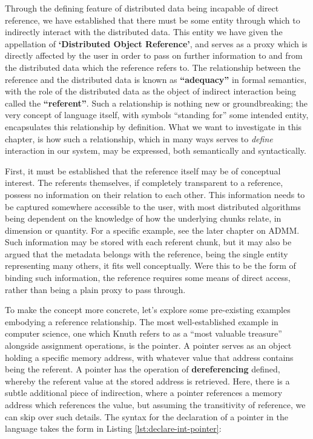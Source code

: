 Through the defining feature of distributed data being incapable of
direct reference, we have established that there must be some entity
through which to indirectly interact with the distributed data. This
entity we have given the appellation of \textbf{`Distributed Object
    Reference'}, and serves as a proxy which is directly affected by the
user in order to pass on further information to and from the distributed
data which the reference refers to. The relationship between the
reference and the distributed data is known as \textbf{``adequacy''} in
formal semantics, with the role of the distributed data as the object of
indirect interaction being called the \textbf{``referent''}. Such a
relationship is nothing new or groundbreaking; the very concept of
language itself, with symbols ``standing for'' some intended entity,
encapsulates this relationship by definition. What we want to
investigate in this chapter, is how such a relationship, which in many
ways serves to \emph{define} interaction in our system, may be
expressed, both semantically and syntactically.

First, it must be established that the reference itself may be of
conceptual interest. The referents themselves, if completely transparent
to a reference, possess no information on their relation to each other.
This information needs to be captured somewhere accessible to the user,
with most distributed algorithms being dependent on the knowledge of how
the underlying chunks relate, in dimension or quantity. For a specific
example, see the later chapter on ADMM. Such information may be stored
with each referent chunk, but it may also be argued that the metadata
belongs with the reference, being the single entity representing many
others, it fits well conceptually. Were this to be the form of binding
such information, the reference requires some means of direct access,
rather than being a plain proxy to pass through.

To make the concept more concrete, let's explore some pre-existing
examples embodying a reference relationship. The most well-established
example in computer science, one which Knuth refers to as a ``most
valuable treasure'' alongside assignment operations, is the pointer. A
pointer serves as an object holding a specific memory address, with
whatever value that address contains being the referent. A pointer has
the operation of \textbf{dereferencing} defined, whereby the referent
value at the stored address is retrieved. Here, there is a subtle
additional piece of indirection, where a pointer references a memory
address which references the value, but assuming the transitivity of
reference, we can skip over such details. The syntax for the declaration
of a pointer in the  language takes the form in Listing \cref{lst:declare-int-pointer}:

